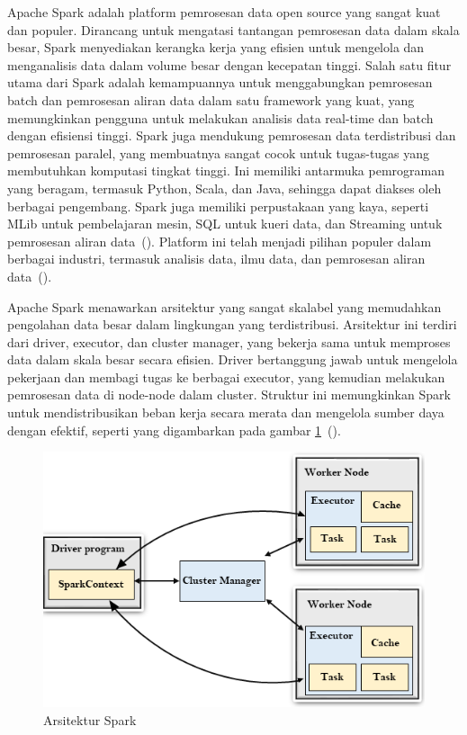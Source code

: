 Apache Spark adalah platform pemrosesan data open source yang
sangat kuat dan populer. Dirancang untuk mengatasi tantangan
pemrosesan data dalam skala besar, Spark menyediakan kerangka
kerja yang efisien untuk mengelola dan menganalisis data dalam
volume besar dengan kecepatan tinggi. Salah satu fitur utama
dari Spark adalah kemampuannya untuk menggabungkan pemrosesan
batch dan pemrosesan aliran data dalam satu framework yang
kuat, yang memungkinkan pengguna untuk melakukan analisis data
real-time dan batch dengan efisiensi tinggi. Spark juga mendukung
pemrosesan data terdistribusi dan pemrosesan paralel, yang
membuatnya sangat cocok untuk tugas-tugas yang membutuhkan
komputasi tingkat tinggi. Ini memiliki antarmuka pemrograman
yang beragam, termasuk Python, Scala, dan Java, sehingga dapat
diakses oleh berbagai pengembang. Spark juga memiliki perpustakaan
yang kaya, seperti MLib untuk pembelajaran mesin, SQL untuk kueri
data, dan Streaming untuk pemrosesan aliran data~(\cite{spark}).
Platform ini telah menjadi pilihan populer dalam berbagai
industri, termasuk analisis data, ilmu data, dan pemrosesan
aliran data~(\cite{shaikh2019}).

Apache Spark menawarkan arsitektur yang sangat skalabel yang memudahkan pengolahan data besar dalam lingkungan yang terdistribusi. Arsitektur ini terdiri dari driver, executor, dan cluster manager, yang bekerja sama untuk memproses data dalam skala besar secara efisien. Driver bertanggung jawab untuk mengelola pekerjaan dan membagi tugas ke berbagai executor, yang kemudian melakukan pemrosesan data di node-node dalam cluster. Struktur ini memungkinkan Spark untuk mendistribusikan beban kerja secara merata dan mengelola sumber daya dengan efektif, 
seperti yang digambarkan pada gambar \ref{fig:sparkArsitektur}~(\cite{spark}).

\begin{figure}[H]
  \centering
  \includegraphics[scale=0.5]{gambar/sparkArsitektur.png}
  \caption{Arsitektur Spark}
  \label{fig:sparkArsitektur}
\end{figure}


